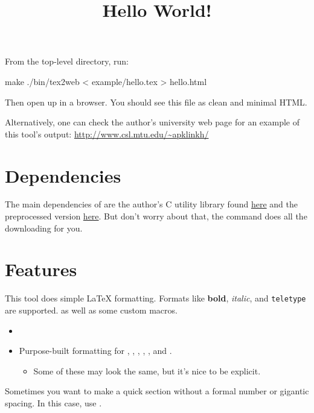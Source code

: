 
\title{Hello World!}
\date{}



From the top-level directory, run:
\begin{code}
make
./bin/tex2web < example/hello.tex > hello.html
\end{code}
Then open up  in a browser.
You should see this file as clean and minimal HTML.

Alternatively, one can check the author's university web page for an example of this tool's output:
\url{http://www.csl.mtu.edu/~apklinkh/}

\section{Dependencies}

The main dependencies of  are the author's C utility library found
\href{http://github.com/grencez/cx}{here}
and the preprocessed version
\href{http://github.com/grencez/cx-pp}{here}.
But don't worry about that, the  command does all the downloading for you.

\section{Features}

This tool does simple LaTeX formatting.
Formats like \textbf{bold}, \textit{italic}, and \texttt{teletype} are supported. as well as some custom macros.

\begin{itemize}
\item {}
\item Purpose-built formatting for , , , , , and .
 \begin{itemize}
 \item Some of these may look the same, but it's nice to be explicit.
 \end{itemize}
\end{itemize}

Sometimes you want to make a quick section without a formal number or gigantic spacing.
In this case, use \ilcode{\quicksec}.



